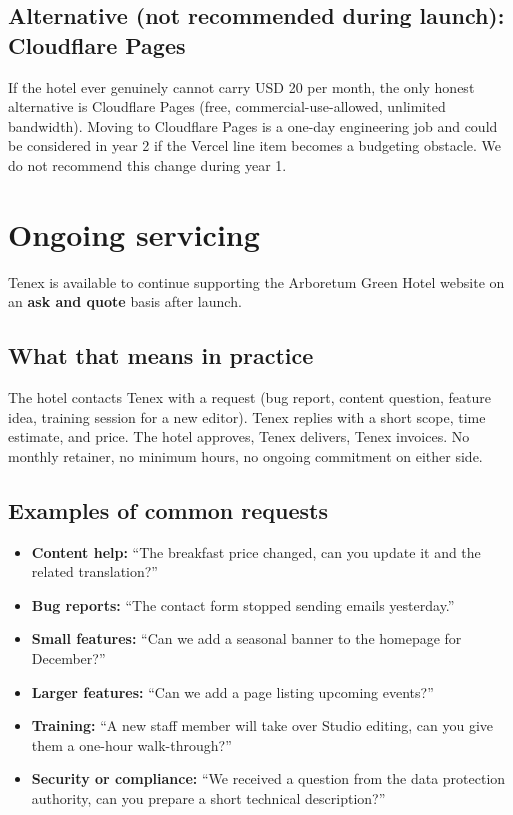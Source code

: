 \documentclass[11pt,a4paper]{article}
\begin{document}
\subsection{Alternative (not recommended during launch): Cloudflare Pages}

If the hotel ever genuinely cannot carry USD 20 per month, the only honest alternative is Cloudflare Pages (free, commercial-use-allowed, unlimited bandwidth). Moving to Cloudflare Pages is a one-day engineering job and could be considered in year 2 if the Vercel line item becomes a budgeting obstacle. We do not recommend this change during year 1.

\section{Ongoing servicing}

Tenex is available to continue supporting the Arboretum Green Hotel website on an \textbf{ask and quote} basis after launch.

\subsection{What that means in practice}

The hotel contacts Tenex with a request (bug report, content question, feature idea, training session for a new editor). Tenex replies with a short scope, time estimate, and price. The hotel approves, Tenex delivers, Tenex invoices. No monthly retainer, no minimum hours, no ongoing commitment on either side.

\subsection{Examples of common requests}

\begin{itemize}
\item \textbf{Content help:} ``The breakfast price changed, can you update it and the related translation?''
\item \textbf{Bug reports:} ``The contact form stopped sending emails yesterday.''
\item \textbf{Small features:} ``Can we add a seasonal banner to the homepage for December?''
\item \textbf{Larger features:} ``Can we add a page listing upcoming events?''
\item \textbf{Training:} ``A new staff member will take over Studio editing, can you give them a one-hour walk-through?''
\item \textbf{Security or compliance:} ``We received a question from the data protection authority, can you prepare a short technical description?''
\end{itemize}
\end{document}
